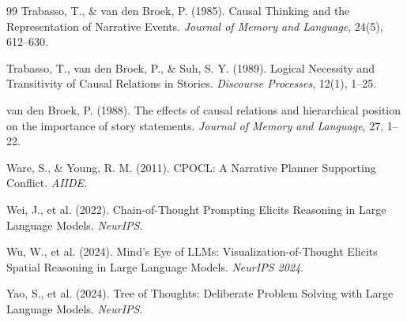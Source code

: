 \documentclass[11pt,letterpaper]{article}
\theoremstyle{defn}
\begin{document}
\begin{thebibliography}{99}
Trabasso, T., \& van den Broek, P. (1985). Causal Thinking and the Representation of Narrative Events. \textit{Journal of Memory and Language}, 24(5), 612--630.

Trabasso, T., van den Broek, P., \& Suh, S. Y. (1989). Logical Necessity and Transitivity of Causal Relations in Stories. \textit{Discourse Processes}, 12(1), 1--25.

van den Broek, P. (1988). The effects of causal relations and hierarchical position on the importance of story statements. \textit{Journal of Memory and Language}, 27, 1--22.

Ware, S., \& Young, R. M. (2011). CPOCL: A Narrative Planner Supporting Conflict. \textit{AIIDE}.

Wei, J., et al. (2022). Chain-of-Thought Prompting Elicits Reasoning in Large Language Models. \textit{NeurIPS}.

Wu, W., et al. (2024). Mind's Eye of LLMs: Visualization-of-Thought Elicits Spatial Reasoning in Large Language Models. \textit{NeurIPS 2024}.

Yao, S., et al. (2024). Tree of Thoughts: Deliberate Problem Solving with Large Language Models. \textit{NeurIPS}.

\end{thebibliography}
\end{document}
